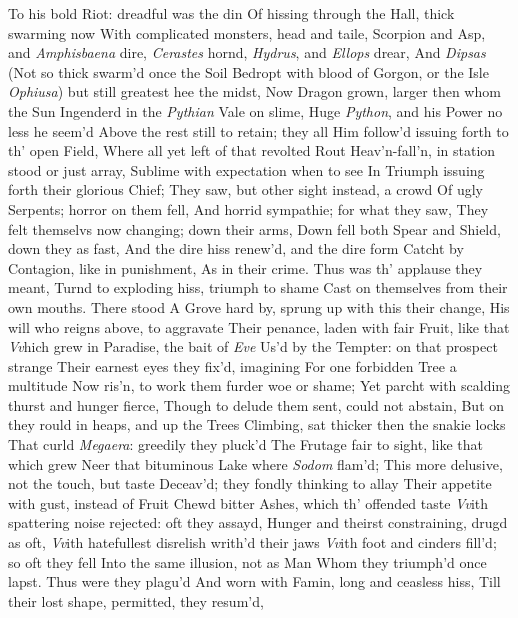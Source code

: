 \documentclass[11pt]{book}
\begin{document}
To his bold Riot: dreadful was the din 
Of hissing through the Hall, thick swarming now 
With complicated monsters, head and taile, 
Scorpion and Asp, and \textit{Amphisbaena} dire, 
\textit{Cerastes} hornd, \textit{Hydrus}, and \textit{Ellops} drear, 
And \textit{Dipsas} (Not so thick swarm'd once the Soil 
Bedropt with blood of Gorgon, or the Isle 
\textit{Ophiusa}) but still greatest hee the midst, 
Now Dragon grown, larger then whom the Sun 
Ingenderd in the \textit{Pythian} Vale on slime, 
Huge \textit{Python}, and his Power no less he seem'd 
Above the rest still to retain; they all 
Him follow'd issuing forth to th' open Field, 
Where all yet left of that revolted Rout 
Heav'n-fall'n, in station stood or just array, 
Sublime with expectation when to see 
In Triumph issuing forth their glorious Chief; 
They saw, but other sight instead, a crowd 
Of ugly Serpents; horror on them fell, 
And horrid sympathie; for what they saw, 
They felt themselvs now changing; down their arms, 
Down fell both Spear and Shield, down they as fast, 
And the dire hiss renew'd, and the dire form 
Catcht by Contagion, like in punishment, 
As in their crime.  Thus was th' applause they meant, 
Turnd to exploding hiss, triumph to shame 
Cast on themselves from their own mouths.  There stood 
A Grove hard by, sprung up with this their change, 
His will who reigns above, to aggravate 
Their penance, laden with fair Fruit, like that 
\textit{Vv}hich grew in Paradise, the bait of \textit{Eve} 
Us'd by the Tempter: on that prospect strange 
Their earnest eyes they fix'd, imagining 
For one forbidden Tree a multitude 
Now ris'n, to work them furder woe or shame; 
Yet parcht with scalding thurst and hunger fierce, 
Though to delude them sent, could not abstain, 
But on they rould in heaps, and up the Trees 
Climbing, sat thicker then the snakie locks 
That curld \textit{Megaera}: greedily they pluck'd 
The Frutage fair to sight, like that which grew 
Neer that bituminous Lake where \textit{Sodom} flam'd; 
This more delusive, not the touch, but taste 
Deceav'd; they fondly thinking to allay 
Their appetite with gust, instead of Fruit 
Chewd bitter Ashes, which th' offended taste 
\textit{Vv}ith spattering noise rejected: oft they assayd, 
Hunger and theirst constraining, drugd as oft, 
\textit{Vv}ith hatefullest disrelish writh'd their jaws 
\textit{Vv}ith foot and cinders fill'd; so oft they fell 
Into the same illusion, not as Man 
Whom they triumph'd once lapst.  Thus were they plagu'd 
And worn with Famin, long and ceasless hiss, 
Till their lost shape, permitted, they resum'd, 
\end{document}

